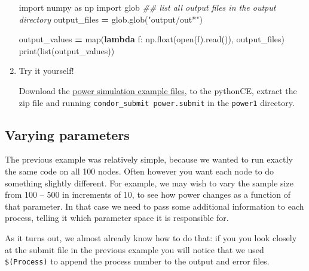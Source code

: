\documentclass[
]{book}
\newenvironment{Shaded}{\begin{snugshade}}{\end{snugshade}}
\newcommand{\BuiltInTok}[1]{#1}
\newcommand{\CommentTok}[1]{\textcolor[rgb]{0.56,0.35,0.01}{\textit{#1}}}
\newcommand{\ImportTok}[1]{#1}
\newcommand{\KeywordTok}[1]{\textcolor[rgb]{0.13,0.29,0.53}{\textbf{#1}}}
\newcommand{\NormalTok}[1]{#1}
\newcommand{\OperatorTok}[1]{\textcolor[rgb]{0.81,0.36,0.00}{\textbf{#1}}}
\newcommand{\StringTok}[1]{\textcolor[rgb]{0.31,0.60,0.02}{#1}}
\begin{document}
\begin{enumerate}
\begin{Shaded}
\begin{Highlighting}[]
\ImportTok{import}\NormalTok{ numpy }\ImportTok{as}\NormalTok{ np}
\ImportTok{import}\NormalTok{ glob}
\CommentTok{\#\# list all output files in the output directory}
\NormalTok{output\_files }\OperatorTok{=}\NormalTok{ glob.glob(}\StringTok{"output/out*"}\NormalTok{)}

\NormalTok{output\_values }\OperatorTok{=} \BuiltInTok{map}\NormalTok{(}\KeywordTok{lambda}\NormalTok{ f: np.}\BuiltInTok{float}\NormalTok{(}\BuiltInTok{open}\NormalTok{(f).read()), output\_files)}
\BuiltInTok{print}\NormalTok{(}\BuiltInTok{list}\NormalTok{(output\_values))}
\end{Highlighting}
\end{Shaded}
\item
  Try it yourself!

  Download the \href{examples_Python/power1.zip}{power simulation example
  files}, to the pythonCE, extract the zip
  file and running \texttt{condor\_submit\ power.submit} in the \texttt{power1}
  directory.
\end{enumerate}

\hypertarget{varying-parameters-1}{%
\subsection{Varying parameters}\label{varying-parameters-1}}

The previous example was relatively simple, because we wanted to run
exactly the same code on all 100 nodes. Often however you want each node
to do something slightly different. For example, we may wish to vary the
sample size from 100 -- 500 in increments of 10, to see how power
changes as a function of that parameter. In that case we need to pass
some additional information to each process, telling it which parameter
space it is responsible for.

As it turns out, we almost already know how to do that: if you you look
closely at the submit file in the previous example you will notice that
we used \texttt{\$(Process)} to append the process number to the output and
error files.
\end{document}
